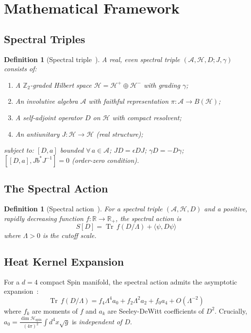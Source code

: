 \documentclass[11pt,a4paper]{article}
\newtheorem{definition}[theorem]{Definition}
\theoremstyle{remark}
\providecommand{\Tr}{\operatorname{Tr}}
\begin{document}
\section{Mathematical Framework}

\subsection{Spectral Triples}

\begin{definition}[Spectral triple~\cite{Con94}]
A real, even spectral triple $(\mathcal{A}, \mathcal{H}, D; J, \gamma)$ consists of:
\begin{enumerate}
  \item A $\mathbb{Z}_2$-graded Hilbert space $\mathcal{H} = \mathcal{H}^+ \oplus \mathcal{H}^-$ with grading $\gamma$;
  \item An involutive algebra $\mathcal{A}$ with faithful representation $\pi: \mathcal{A} \to B(\mathcal{H})$;
  \item A self-adjoint operator $D$ on $\mathcal{H}$ with compact resolvent;
  \item An antiunitary $J: \mathcal{H} \to \mathcal{H}$ (real structure);
\end{enumerate}
subject to: $[D, a]$ bounded $\forall\, a \in \mathcal{A}$; $JD = \epsilon DJ$; $\gamma D = -D\gamma$; $[[D, a], Jb^* J^{-1}] = 0$ (order-zero condition).
\end{definition}

\subsection{The Spectral Action}

\begin{definition}[Spectral action~\cite{CC96}]
For a spectral triple $(\mathcal{A}, \mathcal{H}, D)$ and a positive, rapidly decreasing function $f: \mathbb{R} \to \mathbb{R}_+$, the spectral action is
\[
  S[D] = \Tr\, f(D/\Lambda) + \langle\psi, D\psi\rangle
\]
where $\Lambda > 0$ is the cutoff scale.
\end{definition}

\subsection{Heat Kernel Expansion}

For a $d=4$ compact Spin manifold, the spectral action admits the asymptotic expansion~\cite{CC96, Vas03}:
\[
  \Tr\, f(D/\Lambda) = f_4 \Lambda^4 a_0 + f_2 \Lambda^2 a_2 + f_0 a_4 + O(\Lambda^{-2})
\]
where $f_k$ are moments of $f$ and $a_k$ are Seeley-DeWitt coefficients of $D^2$. Crucially, $a_0 = \frac{\dim\mathcal{H}_{\mathrm{spin}}}{(4\pi)^2} \int d^4x\sqrt{g}$ is \emph{independent of $D$}.
\end{document}
